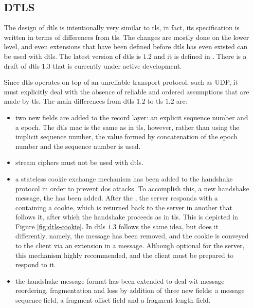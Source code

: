\documentclass{llncs}
\begin{document}
%
\subsection{DTLS}

The design of \gls{dtls} is intentionally very similar to \gls{tls}, in fact, its specification is written
in terms of differences from \gls{tls}. The changes are mostly done on the lower level,
and even extensions that have been defined before \gls{dtls} has even existed can be
used with \gls{dtls}. The latest version of \gls{dtls} is $1.2$ and it is defined
in \cite{RFC6347}. There is a draft of \gls{dtls} $1.3$
\cite{I-D.ietf-tls-dtls13} that is currently under active development.

Since \gls{dtls} operates on top of an unreliable transport protocol, such as
UDP, it must explicitly deal with the absence of reliable and ordered assumptions
that are made by \gls{tls}. The main differences from \gls{dtls} $1.2$ to \gls{tls} $1.2$ are:

\begin{itemize}
  \item two new fields are added to the record layer: an explicit  sequence
  number and a  epoch. The \gls{dtls} \gls{mac} is the same as in \gls{tls},
  however, rather than using the implicit sequence number, the  value
  formed by concatenation of the epoch number and the sequence number is used.

  \item stream ciphers must not be used with \gls{dtls}.

  \item a stateless cookie exchange mechanism has been added to the handshake protocol
  in order to prevent \gls{dos} attacks. To accomplish this, a new handshake
  message, the  has been added. After
  the , the server responds with a 
  containing a cookie, which is returned back to the server in another
   that follows it, after which the handshake proceeds as in \gls{tls}. This is depicted in Figure \ref{fig:dtls-cookie}. In \gls{dtls} $1.3$ follows the same idea, but does it differently, namely,
  the  message has been removed, and the cookie is conveyed to the client via an extension in a  message.
  Although optional for the server, this mechanism highly recommended, and the
  client must be prepared to respond to it.

  \item the handshake message format has been extended to deal wit message reordering,
  fragmentation and loss by addition of three new fields: a message sequence field,
  a fragment offset field and a fragment length field.
\end{itemize}
\end{document}
